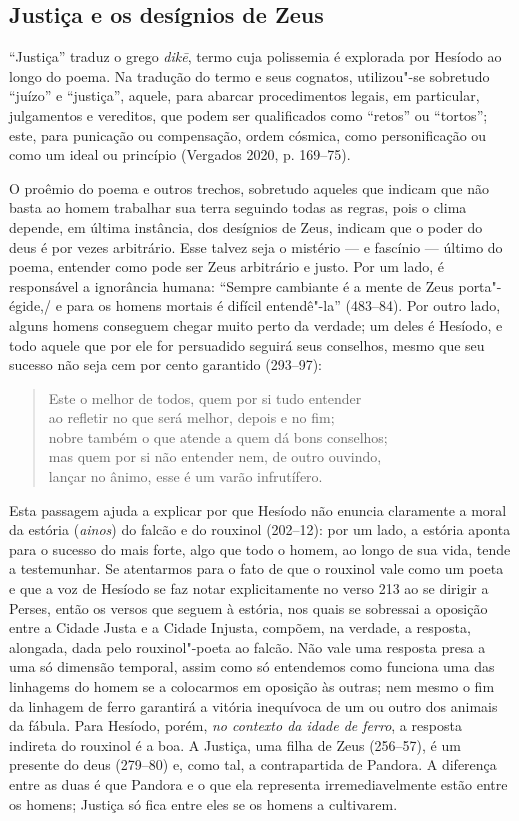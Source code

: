 \subsection{Justiça e os desígnios de Zeus}

``Justiça'' traduz o grego \emph{dikē}, termo cuja polissemia é
explorada por Hesíodo ao longo do poema. Na tradução do termo e seus
cognatos, utilizou"-se sobretudo ``juízo'' e ``justiça'', aquele, para
abarcar procedimentos legais, em particular, julgamentos e vereditos,
que podem ser qualificados como ``retos'' ou ``tortos''; este, para
punicação ou compensação, ordem cósmica, como personificação ou como um
ideal ou princípio (Vergados 2020, p. 169--75).

O proêmio do poema e outros trechos, sobretudo aqueles que indicam que
não basta ao homem trabalhar sua terra seguindo todas as regras, pois o
clima depende, em última instância, dos desígnios de Zeus, indicam que o
poder do deus é por vezes arbitrário. Esse talvez seja o mistério --- e
fascínio --- último do poema, entender como pode ser Zeus arbitrário e
justo. Por um lado, é responsável a ignorância humana: ``Sempre
cambiante é a mente de Zeus porta"-égide,/ e para os homens mortais é
difícil entendê"-la'' (483--84). Por outro lado, alguns homens conseguem
chegar muito perto da verdade; um deles é Hesíodo, e todo aquele que por
ele for persuadido seguirá seus conselhos, mesmo que seu sucesso não
seja cem por cento garantido (293--97):

\begin{verse}
Este o melhor de todos, quem por si tudo entender\\
ao refletir no que será melhor, depois e no fim;\\
nobre também o que atende a quem dá bons conselhos;\\
mas quem por si não entender nem, de outro ouvindo,\\
lançar no ânimo, esse é um varão infrutífero.
\end{verse}

Esta passagem ajuda a explicar por que Hesíodo não enuncia claramente a
moral da estória (\emph{ainos}) do falcão e do rouxinol (202--12): por um
lado, a estória aponta para o sucesso do mais forte, algo que todo o
homem, ao longo de sua vida, tende a testemunhar. Se atentarmos para o
fato de que o rouxinol vale como um poeta e que a voz de Hesíodo se faz
notar explicitamente no verso 213 ao se dirigir a Perses, então os
versos que seguem à estória, nos quais se sobressai a oposição entre a
Cidade Justa e a Cidade Injusta, compõem, na verdade, a resposta,
alongada, dada pelo rouxinol"-poeta ao falcão. Não vale uma resposta
presa a uma só dimensão temporal, assim como só entendemos como funciona
uma das linhagems do homem se a colocarmos em oposição às outras; nem
mesmo o fim da linhagem de ferro garantirá a vitória inequívoca de um ou
outro dos animais da fábula. Para Hesíodo, porém, \emph{no contexto da
idade de ferro}, a resposta indireta do rouxinol é a boa. A Justiça, uma
filha de Zeus (256--57), é um presente do deus (279--80) e, como tal, a
contrapartida de Pandora. A diferença entre as duas é que Pandora e o
que ela representa irremediavelmente estão entre os homens; Justiça só
fica entre eles se os homens a cultivarem.

